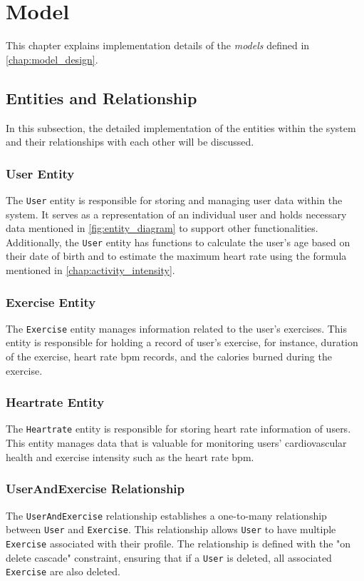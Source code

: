 \section{Model}
\label{chap:model_impl}
This chapter explains implementation details of the \emph{models} defined in \autoref{chap:model_design}.

\subsection{Entities and Relationship}
\label{chap:objectmodel_impl}
In this subsection, the detailed implementation of the entities within the system and their relationships with each other will be discussed.

\subsubsection{User Entity}
The \verb;User; entity is responsible for storing and managing user data within the system.
It serves as a representation of an individual user and holds necessary data mentioned in \autoref{fig:entity_diagram} to support other functionalities.
Additionally, the \verb;User; entity has functions to calculate the user's age based on their date of birth and to estimate the maximum heart rate using the formula mentioned in \autoref{chap:activity_intensity}.

\subsubsection{Exercise Entity}
The \verb;Exercise; entity manages information related to the user's exercises. 
This entity is responsible for holding a record of user's exercise, for instance, duration of the exercise, heart rate bpm records, and the calories burned during the exercise.

\subsubsection{Heartrate Entity}
The \verb;Heartrate; entity is responsible for storing heart rate information of users. 
This entity manages data that is valuable for monitoring users' cardiovascular health and exercise intensity such as the heart rate bpm.

\subsubsection{UserAndExercise Relationship}
The \verb;UserAndExercise; relationship establishes a one-to-many relationship between \verb;User; and \verb;Exercise;. 
This relationship allows \verb;User; to have multiple \verb;Exercise; associated with their profile. 
The relationship is defined with the "on delete cascade" constraint, ensuring that if a \verb;User; is deleted, all associated \verb;Exercise; are also deleted.

